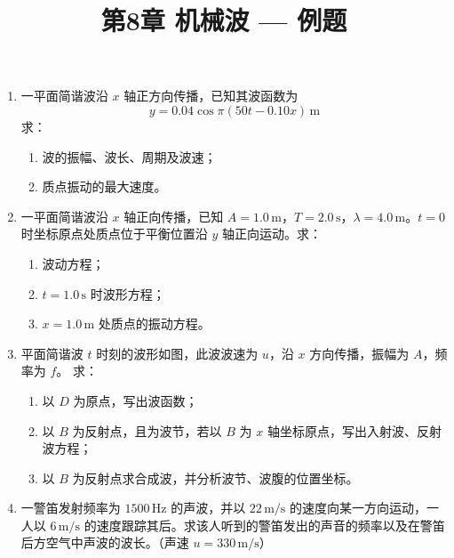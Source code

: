\documentclass{ctexart}
\title{\textbf{第8章 机械波} --- 例题}
\author{}
\date{}
\begin{document}
\maketitle

\begin{enumerate}

\item 一平面简谐波沿 $x$ 轴正方向传播，已知其波函数为
\[
y = 0.04\cos\pi(50t - 0.10x)\,\text{m}
\]
求：
\begin{enumerate}
  \item 波的振幅、波长、周期及波速；
  \item 质点振动的最大速度。
\end{enumerate}

\item 一平面简谐波沿 $x$ 轴正向传播，已知 $A = 1.0\,\text{m}$，$T = 2.0\,\text{s}$，$\lambda = 4.0\,\text{m}$。$t = 0$ 时坐标原点处质点位于平衡位置沿 $y$ 轴正向运动。求：
\begin{enumerate}
  \item 波动方程；
  \item $t = 1.0\,\text{s}$ 时波形方程；
  \item $x = 1.0\,\text{m}$ 处质点的振动方程。
\end{enumerate}

\item 平面简谐波 $t$ 时刻的波形如图，此波波速为 $u$，沿 $x$ 方向传播，振幅为 $A$，频率为 $f$。
求：
\begin{enumerate}
  \item 以 $D$ 为原点，写出波函数；
  \item 以 $B$ 为反射点，且为波节，若以 $B$ 为 $x$ 轴坐标原点，写出入射波、反射波方程；
  \item 以 $B$ 为反射点求合成波，并分析波节、波腹的位置坐标。
\end{enumerate}

\item 一警笛发射频率为 $1500\,\text{Hz}$ 的声波，并以 $22\,\text{m/s}$ 的速度向某一方向运动，一人以 $6\,\text{m/s}$ 的速度跟踪其后。求该人听到的警笛发出的声音的频率以及在警笛后方空气中声波的波长。（声速 $u = 330\,\text{m/s}$）

\end{enumerate}
\end{document}
